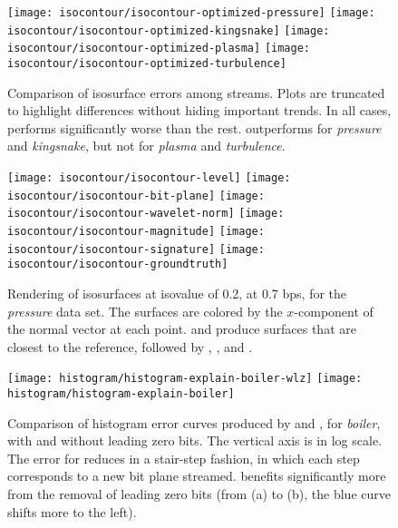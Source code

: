 \begin{figure*}[t]
\centering
{}
{\texttt{[image: isocontour/isocontour-optimized-pressure]}}
{\texttt{[image: isocontour/isocontour-optimized-kingsnake]}}
{\texttt{[image: isocontour/isocontour-optimized-plasma]}}
{\texttt{[image: isocontour/isocontour-optimized-turbulence]}}
\caption{Comparison of isosurface errors among streams. Plots are truncated to highlight differences
without hiding important trends. In all cases, \slvl performs significantly worse than the rest.
\swav outperforms \sbit for \emph{pressure} and \emph{kingsnake}, but not for \emph{plasma} and \emph{turbulence}.}\label{fig:isocontour-plots}
\vspace{1em}

\centering
{}
{\texttt{[image: isocontour/isocontour-level]}}
{\texttt{[image: isocontour/isocontour-bit-plane]}}
{\texttt{[image: isocontour/isocontour-wavelet-norm]}}
{\texttt{[image: isocontour/isocontour-magnitude]}}
{\texttt{[image: isocontour/isocontour-signature]}}
{\texttt{[image: isocontour/isocontour-groundtruth]}}
\caption{Rendering of isosurfaces at isovalue of 0.2, at 0.7 bps, for the \emph{pressure} data set.
The surfaces are colored by the $x$-component of the normal vector at each point. \swav and
\sisg produce surfaces that are closest to the reference, followed by \sbit, \smag, and \slvl.}
\label{fig:isocontour-surfaces-pressure}
\end{figure*}

\begin{figure}[h]
	\centering
	{\texttt{[image: histogram/histogram-explain-boiler-wlz]}}
	{\texttt{[image: histogram/histogram-explain-boiler]}}
	\caption{Comparison of histogram error curves produced by \sbit and \slvl, for \emph{boiler}, with
	and without leading zero bits. The vertical axis is in log scale. The error for \sbit reduces in a
	stair-step fashion, in which each step corresponds to a new bit plane streamed. \sbit benefits
	significantly more from the removal of leading zero bits (from (a) to (b), the blue curve shifts
	more to the left).}
	\label{fig:histogram-explain}
\end{figure}
